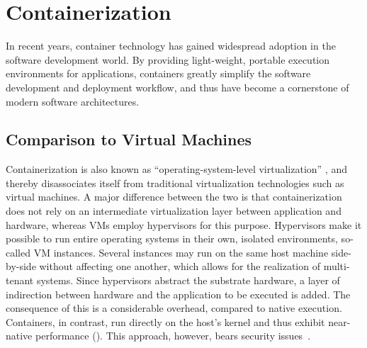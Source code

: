
\section{Containerization}
In recent years, container technology has gained widespread adoption in the software development world. By providing light-weight, portable execution environments for applications, containers greatly simplify the software development and deployment workflow, and thus have become a cornerstone of modern software architectures.

\subsection{Comparison to Virtual Machines}
Containerization is also known as ``operating-system-level virtualization'' \cite{soltesz2007container}, and thereby disassociates itself from traditional virtualization technologies such as virtual machines. A major difference between the two is that containerization does not rely on an intermediate virtualization layer between application and hardware, whereas VMs employ hypervisors for this purpose. Hypervisors make it possible to run entire operating systems in their own, isolated environments, so-called VM instances. Several instances may run on the same host machine side-by-side without affecting one another, which allows for the realization of multi-tenant systems. Since hypervisors abstract the substrate hardware, a layer of indirection between hardware and the application to be executed is added. The consequence of this is a considerable overhead, compared to native execution. Containers, in contrast, run directly on the host's kernel and thus exhibit near-native performance (\cite{adufu2015container, felter2015updated, morabito2015hypervisors}). This approach, however, bears security issues~\cite{xavier2013performance}.

